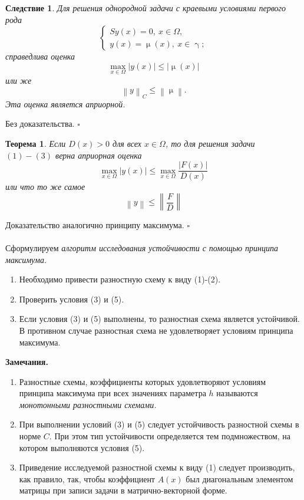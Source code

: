 \documentclass[a4paper, 12pt]{report}
\numberwithin{equation}{section}
\newenvironment{Proof} %
{\par\noindent{$\blacklozenge$}} %
{\hfill$\scriptstyle\square$}
\renewcommand{\leq}{\leqslant}
\renewcommand{\gamma}{\upgamma}
\renewcommand{\mu}{\upmu}
\newcommand\Norm[1]{\left\| #1 \right\|}
\newtheorem*{theorem}{Теорема}
\newtheorem*{cor}{Следствие}
\begin{document}
	\begin{cor}
		Для решения однородной задачи с краевыми условиями первого рода
		$$\begin{cases}
			Sy(x) = 0,\ x\in \Omega,\\
			y(x) = \mu(x),\ x \in \gamma;
		\end{cases}$$
		справедлива оценка
		$$\underset{x \in \Omega}{\max} |y(x)| \leq |\mu(x)|$$
		или же
		\begin{equation}
			\Norm{y}_C \leq \Norm{\mu}.
		\end{equation}
		Эта оценка является априорной.
	\end{cor}
	\begin{Proof}
		Без доказательства.
	\end{Proof}
 \begin{theorem}
	 	Если $D(x)>0$ для всех $x \in \Omega$, то для решения задачи $(1)-(3)$ верна априорная оценка
	 	$$\underset{x \in \Omega}{\max}|y(x)| \leq \underset{x \in \Omega}{\max} \dfrac{|F(x)|}{D(x)}$$
	 	или что то же самое
	 	\begin{equation}
	 		\Norm{y}\leq \Norm{\dfrac{F}{D}}
	 	\end{equation}
 \end{theorem}
 \begin{Proof}
	 	Доказательство аналогично принципу максимума.
 \end{Proof}\\\\
 Сформулируем \textit{алгоритм исследования устойчивости с помощью принципа максимума}.
 \begin{enumerate}
	 	\item Необходимо привести разностную схему к виду (1)-(2).
	 	\item Проверить условия (3) и (5).
	 	\item Если условия (3) и (5) выполнены, то разностная схема является устойчивой. В противном случае разностная схема не удовлетворяет условиям принципа максимума.
 \end{enumerate}
 \textbf{Замечания.}
 \begin{enumerate}
	 	\item Разностные схемы, коэффициенты которых удовлетворяют условиям принципа максимума при всех значениях параметра $h$ называются \textit{монотонными разностными схемами.}
	 	\item При выполнении условий (3) и (5) следует устойчивость разностной схемы в норме $C$. При этом тип устойчивости определяется тем подмножеством, на котором выполняются условия (5). 
	 	\item Приведение исследуемой разностной схемы к виду (1) следует производить, как правило, так, чтобы коэффициент $A(x)$ был диагональным элементом матрицы при записи задачи в матрично-векторной форме.
 \end{enumerate}
\end{document}
